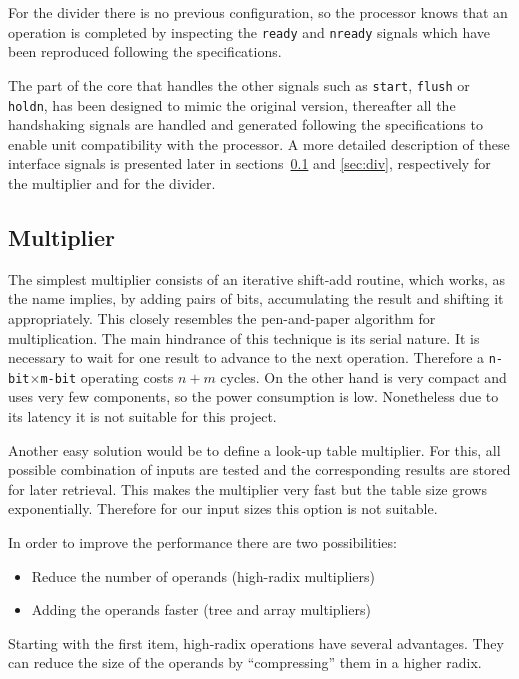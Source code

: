 For the divider there is no previous configuration, so the processor knows that an operation is
completed by inspecting the \texttt{ready} and \texttt{nready} signals which have been reproduced following the
specifications.

The part of the core that handles the other signals such as \texttt{start}, \texttt{flush} or \texttt{holdn}, has been designed
to mimic the original version, thereafter all the handshaking signals are handled and generated following the
specifications to enable unit compatibility with the processor.
A more detailed description of these interface signals is presented later in sections~\ref{sec:mul} and \ref{sec:div}, respectively for the multiplier and for the divider.


\subsection{Multiplier}
\label{sec:mul}

The simplest multiplier consists of an iterative shift-add routine, which works, as the name implies, by adding pairs of bits, accumulating the result and shifting it appropriately. This closely resembles the pen-and-paper algorithm for multiplication. The main hindrance of this technique is its serial nature. It is necessary to wait for one result to advance to the next operation. Therefore a \texttt{n-bit$\times$m-bit} operating costs $n+m$ cycles. On the other hand is very compact and uses very few components, so the power consumption is low. Nonetheless due to its latency it is not suitable for this project.

Another easy solution would be to define a look-up table multiplier. For this, all possible combination of inputs are tested and the corresponding results are stored for later retrieval. This makes the multiplier very fast but the table size grows exponentially. Therefore for our input sizes this option is not suitable.

In order to improve the performance there are two possibilities:
\begin{itemize}
\item Reduce the number of operands (\ie high-radix multipliers)
\item Adding the operands faster (\ie tree and array multipliers)
\end{itemize}

Starting with the first item, high-radix operations have several advantages.
They can reduce the size of the operands by ``compressing'' them in a higher radix.

